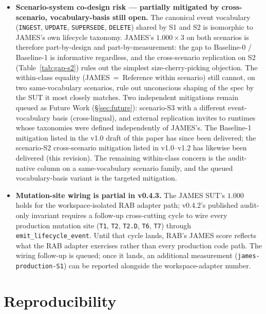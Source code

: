 \documentclass[11pt,a4paper]{article}
\begin{document}
\begin{itemize}[leftmargin=*]
  \item \textbf{Scenario-system co-design risk --- partially mitigated by cross-scenario, vocabulary-basis still open.} The canonical event vocabulary (\texttt{INGEST}, \texttt{UPDATE}, \texttt{SUPERSEDE}, \texttt{DELETE}) shared by S1 and S2 is isomorphic to JAMES's own lifecycle taxonomy. JAMES's $1.000\times3$ on both scenarios is therefore part-by-design and part-by-measurement: the gap to Baseline-0 / Baseline-1 is informative regardless, and the cross-scenario replication on S2 (Table~\ref{tab:gap-s2}) rules out the simplest size-cherry-picking objection. The within-class equality (JAMES~=~Reference within scenario) still cannot, on two same-vocabulary scenarios, rule out unconscious shaping of the spec by the SUT it most closely matches. Two independent mitigations remain queued as Future Work (§\ref{sec:future}): scenario-S3 with a different event-vocabulary basis (cross-lingual), and external replication invites to runtimes whose taxonomies were defined independently of JAMES's. The Baseline-1 mitigation listed in the v1.0 draft of this paper has since been delivered; the scenario-S2 cross-scenario mitigation listed in v1.0--v1.2 has likewise been delivered (this revision). The remaining within-class concern is the audit-native column on a same-vocabulary scenario family, and the queued vocabulary-basis variant is the targeted mitigation.
  \item \textbf{Mutation-site wiring is partial in v0.4.3.} The JAMES SUT's $1.000$ holds for the workspace-isolated RAB adapter path; v0.4.2's published audit-only invariant requires a follow-up cross-cutting cycle to wire every production mutation site (\texttt{T1}, \texttt{T2}, \texttt{T2.D}, \texttt{T6}, \texttt{T7}) through \texttt{emit\_lifecycle\_event}. Until that cycle lands, RAB's JAMES score reflects what the RAB adapter exercises rather than every production code path. The wiring follow-up is queued; once it lands, an additional measurement (\texttt{james-production-S1}) can be reported alongside the workspace-adapter number.
\end{itemize}

\section{Reproducibility}
\label{sec:repro}
\end{document}
